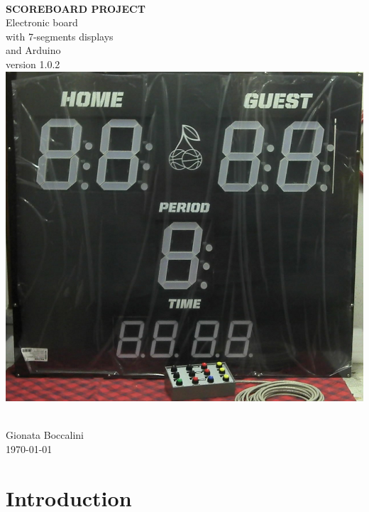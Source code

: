 \documentclass[11pt,english]{article}
\begin{document}
\begin{titlepage}
\begin{center} 

~\\[1.5cm] 
\textbf{{\Huge SCOREBOARD PROJECT}
~\\[0.7cm]}
\LARGE{Electronic board \\
with 7-segments displays\\
and Arduino
~\\[0.8cm]
version 1.0.2}
~\\[1.6cm]

\includegraphics[scale=0.30]{img/Scoreboard}

~\\[1.5cm]
\normalsize Gionata Boccalini
~\\[0.5cm]
\normalsize \today

\end{center} 
\vspace*{1cm}
\end{titlepage}


\newpage{}

\tableofcontents{}


\listoffigures

\lstlistoflistings

\newpage{}



\section{Introduction}
\end{document}
